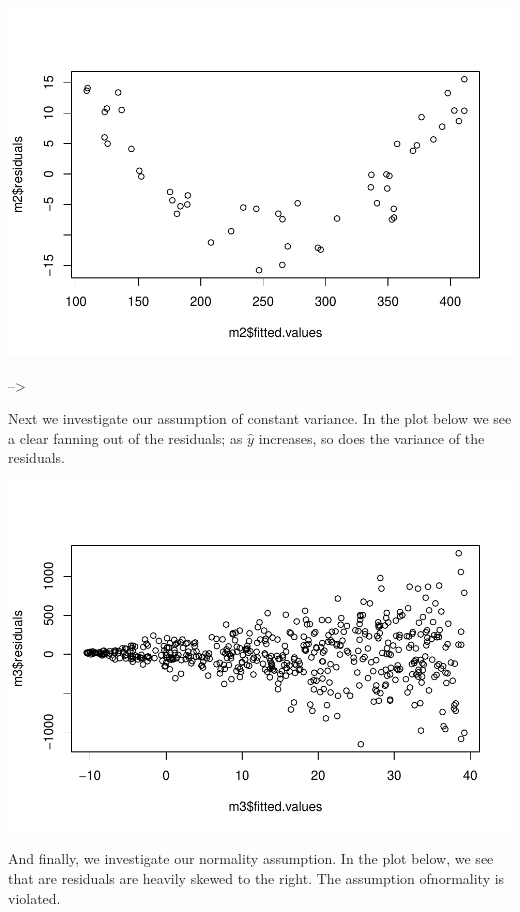 \documentclass[
]{book}
\begin{document}
\includegraphics{MA206supplement_files/figure-latex/unnamed-chunk-12-1.pdf}

--\textgreater{}

Next we investigate our assumption of constant variance. In the plot below we see a clear fanning out of the residuals; as \(\hat{y}\) increases, so does the variance of the residuals.

\includegraphics{MA206supplement_files/figure-latex/unnamed-chunk-14-1.pdf}

And finally, we investigate our normality assumption. In the plot below, we see that are residuals are heavily skewed to the right. The assumption ofnormality is violated.
\end{document}
